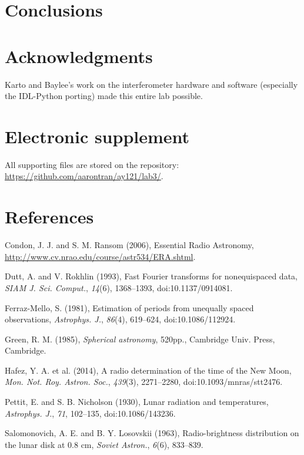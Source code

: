 \documentclass[10pt]{article}
\begin{document}
\section{Conclusions}



\section{Acknowledgments}

Karto and Baylee's work on the interferometer hardware and software (especially the IDL-Python porting) made this entire lab possible.

\section{Electronic supplement}

All supporting files are stored on the repository:\\
\href{https://github.com/aarontran/ay121}
{https://github.com/aarontran/ay121/lab3/}.

\section{References}

\hangindent 0.25in Condon, J. J. and S. M. Ransom (2006), Essential Radio Astronomy, \\
\href{http://www.cv.nrao.edu/course/astr534/ERA.shtml}
{http://www.cv.nrao.edu/course/astr534/ERA.shtml}.

\hangindent 0.25in Dutt, A. and V. Rokhlin (1993), Fast Fourier transforms for
nonequispaced data, \textit{SIAM J. Sci. Comput.}, \textit{14}(6),
1368--1393, doi:10.1137/0914081.

\hangindent 0.25in Ferraz-Mello, S. (1981), Estimation of periods from
unequally spaced observations, \textit{Astrophys. J.}, \textit{86}(4),
619--624, doi:10.1086/112924.

\hangindent 0.25in Green, R. M. (1985), \textit{Spherical astronomy}, 520pp.,
Cambridge Univ. Press, Cambridge.

\hangindent 0.25in Hafez, Y. A. et al. (2014), A radio determination of the time of the New Moon, \textit{Mon. Not. Roy. Astron. Soc.}, \textit{439}(3), 2271--2280, doi:10.1093/mnras/stt2476.

\hangindent 0.25in Pettit, E. and S. B. Nicholson (1930), Lunar radiation and temperatures, \textit{Astrophys. J.}, \textit{71}, 102--135, doi:10.1086/143236.

\hangindent 0.25in Salomonovich, A. E. and B. Y. Losovskii (1963), Radio-brightness distribution on the lunar disk at 0.8 cm, \textit{Soviet Astron.}, \textit{6}(6), 833--839.
\end{document}
